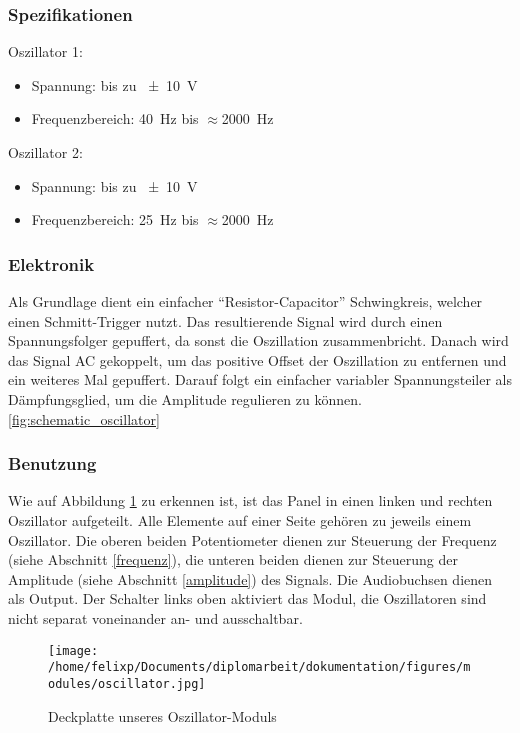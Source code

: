 \subsubsection{Spezifikationen}
\label{sec:org9644746}
Oszillator 1:
\begin{itemize}
\item Spannung: bis zu \SI{\pm10}{\volt}
\item Frequenzbereich: \SI{40}{\hertz} bis \(\approx\)\SI{2000}{\hertz}
\end{itemize}

Oszillator 2:
\begin{itemize}
\item Spannung: bis zu \SI{\pm10}{\volt}
\item Frequenzbereich: \SI{25}{\hertz} bis \(\approx\)\SI{2000}{\hertz}
\end{itemize}

\subsubsection{Elektronik}
\label{sec:org79578ed}
Als Grundlage dient ein einfacher "`Resistor-Capacitor"' Schwingkreis, welcher einen Schmitt-Trigger nutzt. Das resultierende Signal wird durch einen Spannungsfolger gepuffert, da sonst die Oszillation zusammenbricht. Danach wird das Signal AC gekoppelt, um das positive Offset der Oszillation zu entfernen und ein weiteres Mal gepuffert. Darauf folgt ein einfacher variabler Spannungsteiler als Dämpfungsglied, um die Amplitude regulieren zu können. \ref{fig:schematic_oscillator}

\subsubsection{Benutzung}
\label{sec:org20c44c6}
Wie auf Abbildung \ref{fig:org3f2c897} zu erkennen ist, ist das Panel in einen linken und rechten Oszillator aufgeteilt. Alle Elemente auf einer Seite gehören zu jeweils einem Oszillator. Die oberen beiden Potentiometer dienen zur Steuerung der Frequenz (siehe Abschnitt \ref{frequenz}), die unteren beiden dienen zur Steuerung der Amplitude (siehe Abschnitt \ref{amplitude}) des Signals. Die Audiobuchsen dienen als Output. Der Schalter links oben aktiviert das Modul, die Oszillatoren sind nicht separat voneinander an- und ausschaltbar.

\begin{figure}[htbp]
\centering
\texttt{[image: /home/felixp/Documents/diplomarbeit/dokumentation/figures/modules/oscillator.jpg]}
\caption{\label{fig:org3f2c897}Deckplatte unseres Oszillator-Moduls}
\end{figure}

